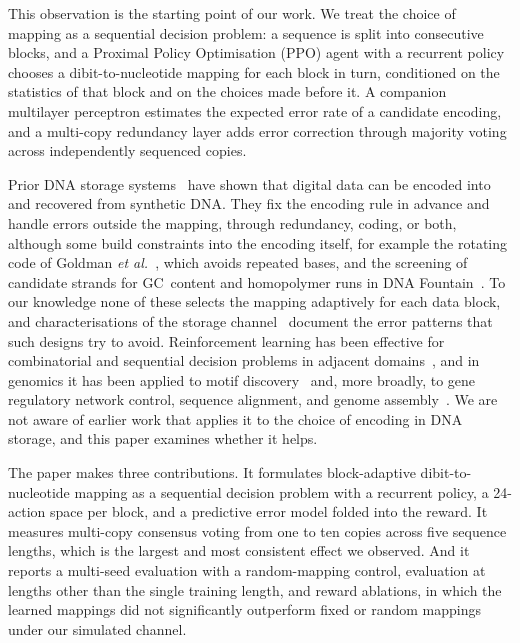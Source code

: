 \documentclass[entropy,article,submit,moreauthors]{Definitions/mdpi}
\begin{document}
This observation is the starting point of our work. We treat the choice of mapping as a sequential decision problem: a sequence is split into consecutive blocks, and a Proximal Policy Optimisation (PPO) agent with a recurrent policy chooses a dibit-to-nucleotide mapping for each block in turn, conditioned on the statistics of that block and on the choices made before it. A companion multilayer perceptron estimates the expected error rate of a candidate encoding, and a multi-copy redundancy layer adds error correction through majority voting across independently sequenced copies.

Prior DNA storage systems~\cite{church2012, goldman2013, erlich2017, organick2018} have shown that digital data can be encoded into and recovered from synthetic DNA. They fix the encoding rule in advance and handle errors outside the mapping, through redundancy, coding, or both, although some build constraints into the encoding itself, for example the rotating code of Goldman \textit{et al.}~\cite{goldman2013}, which avoids repeated bases, and the screening of candidate strands for GC~content and homopolymer runs in DNA Fountain~\cite{erlich2017}. To our knowledge none of these selects the mapping adaptively for each data block, and characterisations of the storage channel~\cite{heckel2019} document the error patterns that such designs try to avoid. Reinforcement learning has been effective for combinatorial and sequential decision problems in adjacent domains~\cite{sutton2018, mazyavkina2021, angermueller2020}, and in genomics it has been applied to motif discovery~\cite{wang2022rlmd} and, more broadly, to gene regulatory network control, sequence alignment, and genome assembly~\cite{karami2024genomics}. We are not aware of earlier work that applies it to the choice of encoding in DNA storage, and this paper examines whether it helps.

The paper makes three contributions. It formulates block-adaptive dibit-to-nucleotide mapping as a sequential decision problem with a recurrent policy, a 24-action space per block, and a predictive error model folded into the reward. It measures multi-copy consensus voting from one to ten copies across five sequence lengths, which is the largest and most consistent effect we observed. And it reports a multi-seed evaluation with a random-mapping control, evaluation at lengths other than the single training length, and reward ablations, in which the learned mappings did not significantly outperform fixed or random mappings under our simulated channel.
\end{document}
